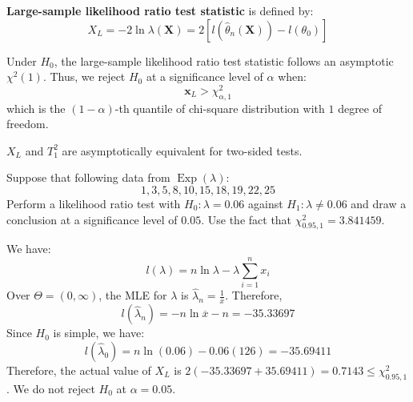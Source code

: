 \documentclass{huhtakm-template-book-v2}
\DeclareMathOperator{\Exp}{Exp}
\begin{document}
\begin{defn}
	\textbf{Large-sample likelihood ratio test statistic} is defined by:
	\begin{equation*}
		X_{L}=-2\ln{\lambda(\mathbf{X})}=2\left[l\left(\hat{\theta}_{n}(\mathbf{X})\right)-l(\theta_{0})\right]
	\end{equation*}
\end{defn}
\begin{thm}
	Under $H_{0}$, the large-sample likelihood ratio test statistic follows an asymptotic $\chi^{2}(1)$. Thus, we reject $H_{0}$ at a significance level of $\alpha$ when:
	\begin{equation*}
		\mathbf{x}_{L}>\chi_{\alpha,1}^{2}
	\end{equation*}
	which is the $(1-\alpha)$-th quantile of chi-square distribution with $1$ degree of freedom.
\end{thm}
\begin{rem}
	$X_{L}$ and $T_{1}^{2}$ are asymptotically equivalent for two-sided tests.
\end{rem}
\begin{eg}
	Suppose that following data from $\Exp(\lambda)$:
	\begin{equation*}
		1,3,5,8,10,15,18,19,22,25
	\end{equation*}
	Perform a likelihood ratio test with $H_{0}:\lambda=0.06$ against $H_{1}:\lambda\neq 0.06$ and draw a conclusion at a significance level of $0.05$. Use the fact that $\chi_{0.95,1}^{2}=3.841459$.
	
	We have:
	\begin{equation*}
		l(\lambda)=n\ln{\lambda}-\lambda\sum_{i=1}^{n}x_{i}
	\end{equation*}
	Over $\Theta=(0,\infty)$, the MLE for $\lambda$ is $\hat{\lambda}_{n}=\frac{1}{\overline{x}}$. Therefore,
	\begin{equation*}
		l(\hat{\lambda}_{n})=-n\ln{\overline{x}}-n=-35.33697
	\end{equation*}
	Since $H_{0}$ is simple, we have:
	\begin{equation*}
		l(\hat{\lambda}_{0})=n\ln(0.06)-0.06(126)=-35.69411
	\end{equation*}
	Therefore, the actual value of $X_{L}$ is $2(-35.33697+35.69411)=0.7143\leq\chi_{0.95,1}^{2}$. We do not reject $H_{0}$ at $\alpha=0.05$.
\end{eg}

\newpage
\end{document}
